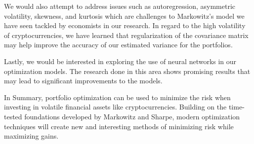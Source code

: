 \documentclass[11pt]{article} %
\begin{document}
We would also attempt to address issues such as autoregression, asymmetric volatility, skewness, and kurtosis which are challenges to Markowitz’s model we have seen tackled by economists in our research. In regard to the high volatility of cryptocurrencies, we have learned that regularization of the covariance matrix may help improve the accuracy of our estimated variance for the portfolios.

Lastly, we would be interested in exploring the use of neural networks in our optimization models. The research done in this area shows promising results that may lead to significant improvements to the models.

In Summary, portfolio optimization can be used to minimize the risk when investing in volatile financial assets like cryptocurrencies. Building on the time-tested foundations developed by Markowitz and Sharpe, modern optimization techniques will create new and interesting methods of minimizing risk while maximizing gains.
\end{document}
